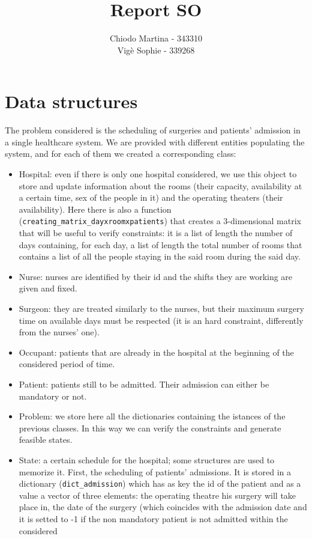 \documentclass{article}
\title{Report SO}
\author{Chiodo Martina - 343310 \\ Vigè Sophie - 339268}
\date{}
\begin{document}


\section{Data structures}
The problem considered is the scheduling of surgeries and patients' admission in a single healthcare 
system. We are provided with different entities populating the system, and for each of them we created a corresponding class:
\begin{itemize}
    \item Hospital: even if there is only one hospital considered, we use this object to store and update information about 
    the rooms (their capacity, availability at a certain time, sex of the people in it) and the operating theaters (their availability). 
    Here there is also a function (\texttt{creating\_matrix\_dayxroomxpatients}) that creates a 3-dimensional matrix that will be useful to verify constraints: 
    it is a list of length the number of days containing, for each day, a list of length the total number of rooms that contains a list of all the people
    staying in the said room during the said day.
    \item Nurse: nurses are identified by their id and the shifts they are working are given and fixed.
    \item Surgeon: they are treated similarly to the nurses, but their maximum surgery time on available days must be respected (it is an hard 
    constraint, differently from the nurses' one).
    \item Occupant: patients that are already in the hospital at the beginning of the considered period of time.
    \item Patient: patients still to be admitted. Their admission can either be mandatory or not.
    \item Problem: we store here all the dictionaries containing the istances of the previous classes. In this way we can verify 
    the constraints and generate feasible states.
    \item State: a certain schedule for the hospital; some structures are used to memorize it. 
    First, the scheduling of patients' admissions. It is stored in a dictionary (\texttt{dict\_admission}) which has as key the id of the patient and 
    as a value a vector of three elements: the operating theatre his surgery will take place in, the date of the surgery (which 
    coincides with the admission date and it is setted to -1 if the non mandatory patient is not admitted within the considered 

\end{itemize}
\end{document}
